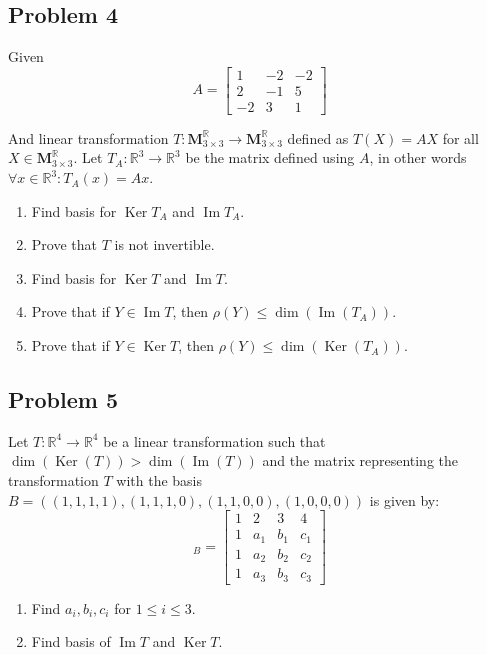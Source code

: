 \documentclass[fleqn]{article}
\DeclareMathOperator{\Dim}{dim}
\DeclareMathOperator{\Image}{Im}
\DeclareMathOperator{\Ker}{Ker}
\begin{document}
\subsection{Problem 4}
\label{sec-1-4}
Given
\begin{equation*}
  A =
  \begin{bmatrix}
     1 & -2 & -2 \\
     2 & -1 &  5 \\
    -2 &  3 &  1 
  \end{bmatrix}
\end{equation*}

And linear transformation $T:\textbf{M}^{\mathbb{R}}_{3 \times 3}
   \to\textbf{M}^{\mathbb{R}}_{3 \times 3}$ defined as $T(X)=AX$ for all
$X \in \textbf{M}^{\mathbb{R}}_{3 \times 3}$.
Let $T_A:\mathbb{R}^3\to\mathbb{R}^3$ be the matrix defined using $A$, in other
words $\forall x \in \mathbb{R}^3 : T_A(x)=Ax$.

\begin{enumerate}
\item Find basis for $\Ker{T_A}$ and $\Image{T_A}$.
\item Prove that $T$ is not invertible.
\item Find basis for $\Ker{T}$ and $\Image{T}$.
\item Prove that if $Y \in \Image{T}$, then $\rho(Y) \leq \Dim(\Image(T_A))$.
\item Prove that if $Y \in \Ker{T}$, then $\rho(Y) \leq \Dim(\Ker(T_A))$.
\end{enumerate}
\subsection{Problem 5}
\label{sec-1-5}
Let $T:\mathbb{R}^4\to\mathbb{R}^4$ be a linear transformation such that
$\Dim(\Ker(T))>\Dim(\Image(T))$ and the matrix representing the transformation
$T$ with the basis $B=((1,1,1,1),(1,1,1,0),(1,1,0,0),(1,0,0,0))$ is given
by:
\begin{equation*}
  [T]_B =
  \begin{bmatrix}
    1 & 2 & 3 & 4 \\
    1 & a_1 & b_1 & c_1 \\
    1 & a_2 & b_2 & c_2 \\
    1 & a_3 & b_3 & c_3
  \end{bmatrix}
\end{equation*}

\begin{enumerate}
\item Find $a_i,b_i,c_i$ for $1 \leq i \leq 3$.
\item Find basis of $\Image{T}$ and $\Ker{T}$.
\end{enumerate}
\end{document}
